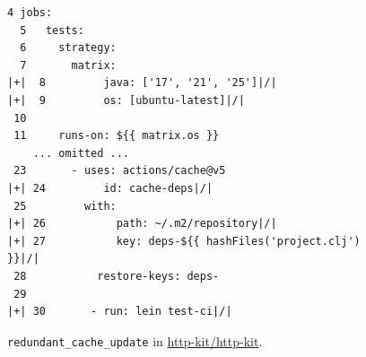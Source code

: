 \begin{figure}[!htbp]
\centering
\begin{lstlisting}[style=ccscase]
  4 jobs:
  5   tests:
  6     strategy:
  7       matrix:
|+|  8         java: ['17', '21', '25']|/|
|+|  9         os: [ubuntu-latest]|/|
 10 
 11     runs-on: ${{ matrix.os }}
    ... omitted ...
 23       - uses: actions/cache@v5
|+| 24         id: cache-deps|/|
 25         with:
|+| 26           path: ~/.m2/repository|/|
|+| 27           key: deps-${{ hashFiles('project.clj') }}|/|
 28           restore-keys: deps-
 29 
|+| 30       - run: lein test-ci|/|
\end{lstlisting}
\caption{\texttt{redundant\_cache\_update} in \href{https://github.com/http-kit/http-kit/blob/7bd0a06ae2d5e50a44ec38fb0f672897352cfe8d/.github/workflows/main-tests.yml}{http-kit/http-kit}.}
\label{fig:ccs-redundant-update}
\end{figure}

